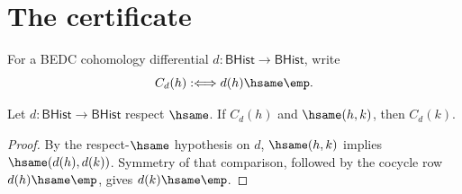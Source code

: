 \section{The certificate}
\label{sec:cohomology-certificate}

\begin{definition}
\label{def:cohomology-cocycle-predicate}
For a BEDC cohomology differential $d:\mathsf{BHist}\to\mathsf{BHist}$, write
$$
C_d(h) :\Longleftrightarrow d(h)\hsame\emp.
$$
\end{definition}

\begin{lemma}
\label{lem:cohomology-cocycle-hsame-transport}
Let $d:\mathsf{BHist}\to\mathsf{BHist}$ respect $\hsame$. If $C_d(h)$ and $\hsame(h,k)$, then $C_d(k)$.
\end{lemma}
\begin{proof}
By the respect-$\hsame$ hypothesis on $d$, $\hsame(h,k)$ implies $\hsame(d(h),d(k))$. Symmetry of that comparison, followed by the cocycle row $d(h)\hsame\emp$, gives $d(k)\hsame\emp$.
\end{proof}

